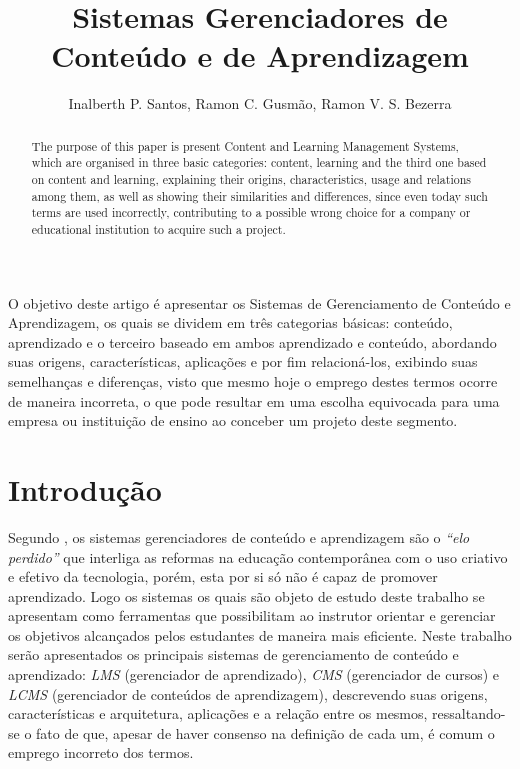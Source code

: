 \documentclass[12pt]{article}
\title{Sistemas Gerenciadores de Conteúdo e de Aprendizagem}
\author{Inalberth P. Santos\inst{1}, Ramon C. Gusmão\inst{1}, Ramon V. S. Bezerra\inst{1}}
\begin{document}
 
    
\maketitle

\begin{abstract}
  The purpose of this paper is present Content and Learning Management Systems, which are organised in three basic categories: content, learning and the third one 
  based on content and learning, explaining their origins, characteristics, usage and relations among them, as well as showing their similarities 
  and differences, since even today such terms are used incorrectly, contributing to a possible wrong choice for a company or educational 
  institution to acquire such a project.
\end{abstract}
     
\begin{resumo} 
  O objetivo deste artigo é apresentar os Sistemas de Gerenciamento de Conteúdo e Aprendizagem, os quais se dividem em três categorias básicas:
  conteúdo, aprendizado e o terceiro baseado em ambos aprendizado e conteúdo, abordando suas origens, características, aplicações e por fim 
  relacioná-los, exibindo suas semelhanças e diferenças, visto que mesmo hoje o emprego destes termos ocorre de maneira incorreta, o que pode 
  resultar em uma escolha equivocada para uma empresa ou instituição de ensino ao conceber um projeto deste segmento.
\end{resumo}

\section{Introdução} \label{sec:introducao}

Segundo \cite{phillipo2012link}, os sistemas gerenciadores de conteúdo e aprendizagem são o \emph{``elo perdido''} que interliga as reformas na 
educação contemporânea com o uso criativo e efetivo da tecnologia, porém, esta por si só não é capaz de promover aprendizado. 
Logo os sistemas os quais são objeto de estudo deste trabalho se apresentam como ferramentas que possibilitam ao instrutor orientar e 
gerenciar os objetivos alcançados pelos estudantes de maneira mais eficiente. Neste trabalho serão apresentados os principais sistemas de 
gerenciamento de conteúdo e aprendizado: \emph{LMS} (gerenciador de aprendizado), \emph{CMS} (gerenciador de cursos) e \emph{LCMS} (gerenciador de conteúdos de 
aprendizagem), descrevendo suas origens, características e arquitetura, aplicações e a relação entre os mesmos, ressaltando-se o fato de que, 
apesar de haver consenso na definição de cada um, é comum o emprego incorreto dos termos.
\end{document}
